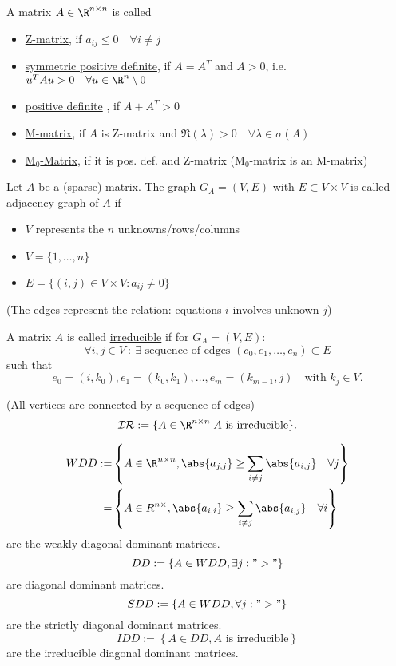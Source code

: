 \begin{definition}
\label{thm:typeOfMatrices}
	A matrix $A \in  \R^{n \times n}$ is called
	\begin{itemize}
		\item \underline{Z-matrix}, if $a_{ij}\leq 0\quad \forall i\neq j$
		\item \underline{symmetric positive definite}, if $A=A^{T}$ and $A>0$, i.e. $u^{T}Au>0\quad\forall u \in \R^{n} \setminus 0$
		\item \underline{positive definite} , if $A+A^{T}>0$
		\item \underline{M-matrix}, if $A$ is Z-matrix and $\Re(\lambda) > 0 \quad\forall \lambda \in \sigma (A)$
		\item \underline{M$_{0}$-Matrix}, if it is pos. def. and Z-matrix (M$_{0}$-matrix is an M-matrix)
	\end{itemize}
\end{definition}

\begin{definition}
\label{thm:adjacenyGraph}
Let $A$ be a (sparse) matrix. The graph $G_{A}=(V,E)$ with $E \subset V \times V$ is called \underline{adjacency graph} of $A$ if 
\begin{itemize}[label=]
	\item $V$ represents the $n$ unknowns/rows/columns
	\item $V=\{1, \ldots, n\}$
	\item $E=\{(i,j) \in  V \times V : a_{ij}\neq 0\}$
\end{itemize}
(The edges represent the relation: equations $i$ involves unknown $j$)
\end{definition}

\begin{definition}
\label{thm:irreducible}
A matrix $A$ is called \underline{irreducible} if for $G_{A}=(V,E)$:
\[
	\forall i,j \in V ~:~ \exists \text{ sequence of edges } (e_0, e_1, \ldots , e_{n}) \subset E
\] 
such that
\[
	e_0=(i, k_0), e_1=(k_0,k_1),\ldots , e_{m}=(k_{m-1},j) \quad \text{with } k_{j} \in V
.\] 

(All vertices are connected by a sequence of edges)
\[
	\mathcal{IR}:= \{A \in  \R^{n \times  n} | A \text{ is irreducible}\}
.\] 
\end{definition}

\begin{definition}
\label{thm:WDDmatrices}
\begin{align*}
	WDD:= &\left\{ A \in \R^{n \times n}, \abs{a_{j,j}}  \geq \sum_{i\neq j}^{}{\abs{a_{i,j}} } \quad \forall j \right\}  \\
		 = &\left\{ A \in R^{n \times }, \abs{a_{i,i}} \geq \sum_{i\neq j}^{}{\abs{a_{i,j}} } \quad \forall i \right\} 
\end{align*}
are the weakly diagonal dominant matrices.
\[
DD:= \left\{ A \in WDD, \exists j : ">" \right\} 
\] 
are diagonal dominant matrices.
\[
SDD := \left\{ A \in WDD, \forall j : ">" \right\} 
\] 
are the strictly diagonal dominant matrices.
\[
IDD := \left\{ A \in DD, A \text{ is irreducible} \right\} 
\] 
are the irreducible diagonal dominant matrices.
\end{definition}

